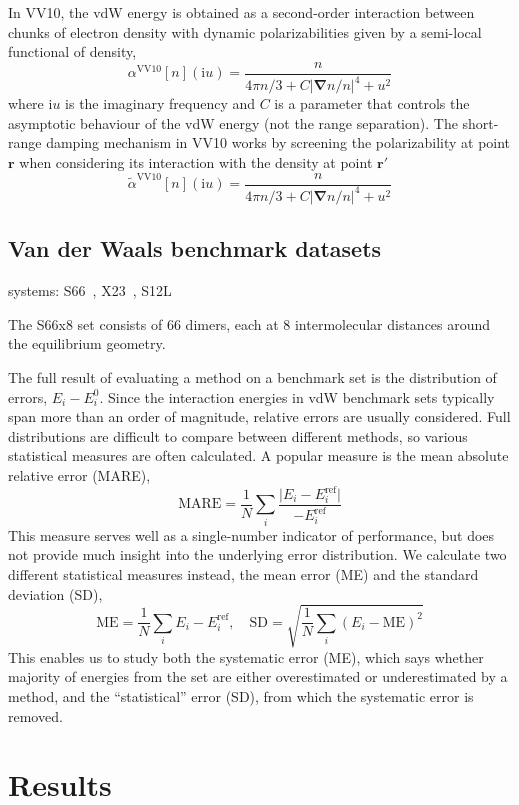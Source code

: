 In VV10, the vdW energy is obtained as a second-order interaction between chunks of electron density with dynamic polarizabilities given by a semi-local functional of density,
\[
\alpha^\text{VV10}[n](\mathrm iu)=\frac n{4\pi n/3+C\lvert\boldsymbol\nabla n/n\rvert^4+u^2}
\]
where $\mathrm iu$ is the imaginary frequency and $C$ is a parameter that controls the asymptotic behaviour of the vdW energy (not the range separation).
The short-range damping mechanism in VV10 works by screening the polarizability at point $\mathbf r$ when considering its interaction with the density at point $\mathbf r'$
\[
\tilde\alpha^\text{VV10}[n](\mathrm iu)=\frac n{4\pi n/3+C\lvert\boldsymbol\nabla n/n\rvert^4+u^2}
\]

\subsection{Van der Waals benchmark datasets}

systems: S66~\cite{RezacJCTC11}, X23~\cite{ReillyJCP13}, S12L~\cite{RisthausJCTC13}

The S66x8 set consists of 66 dimers, each at 8 intermolecular distances around the equilibrium geometry.

The full result of evaluating a method on a benchmark set is the distribution of errors, ${E_i-E_i^0}$.
Since the interaction energies in vdW benchmark sets typically span more than an order of magnitude, relative errors are usually considered.
Full distributions are difficult to compare between different methods, so various statistical measures are often calculated.
A popular measure is the mean absolute relative error (MARE),
\[
\text{MARE}=\frac1N\sum_i\frac{\lvert E_i-E_i^\text{ref}\rvert}{-E_i^\text{ref}}
\]
This measure serves well as a single-number indicator of performance, but does not provide much insight into the underlying error distribution.
We calculate two different statistical measures instead, the mean error (ME) and the standard deviation (SD),
\[
\text{ME}=\frac1N\sum_i E_i-E_i^\text{ref},\quad
\text{SD}=\sqrt{\frac1N\sum_i(E_i-\text{ME})^2}
\]
This enables us to study both the systematic error (ME), which says whether majority of energies from the set are either overestimated or underestimated by a method, and the ``statistical'' error (SD), from which the systematic error is removed.

\section{Results}

